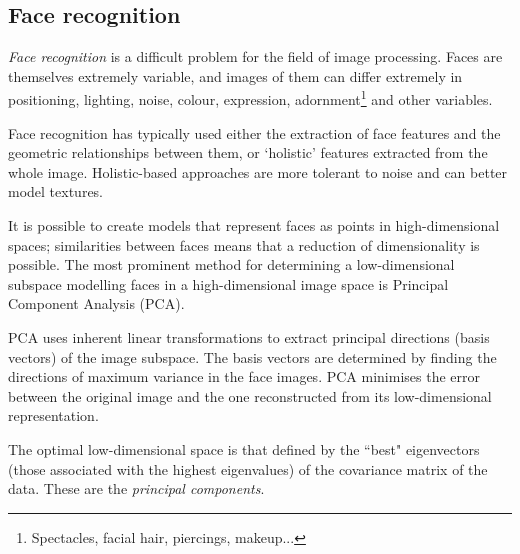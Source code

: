 \subsection{Face recognition}
\label{sec:face-rec-prior}

\emph{Face recognition} is a difficult problem for the field of image processing. Faces are themselves extremely variable, and images of them can differ extremely in positioning, lighting, noise, colour, expression, adornment\footnote{ Spectacles, facial hair, piercings, makeup...} and other variables.

Face recognition has typically used either the extraction of face features and the geometric relationships between them, or `holistic' features extracted from the whole image. \cite{eigenfaces} Holistic-based approaches are more tolerant to noise and can better model textures.

It is possible to create models that represent faces as points in high-dimensional spaces; similarities between faces means that a reduction of dimensionality is possible. The most prominent method for determining a low-dimensional subspace modelling faces in a high-dimensional image space is Principal Component Analysis (PCA). \cite{eigenfaces}

PCA uses inherent linear transformations to extract principal directions (basis vectors) of the image subspace. \cite{pca} The basis vectors are determined by finding the directions of maximum variance in the face images. PCA minimises the error between the original image and the one reconstructed from its low-dimensional representation.

The optimal low-dimensional space is that defined by the ``best" eigenvectors (those associated with the highest eigenvalues) of the covariance matrix of the data. These are the \emph{principal components}. \cite{pca}


